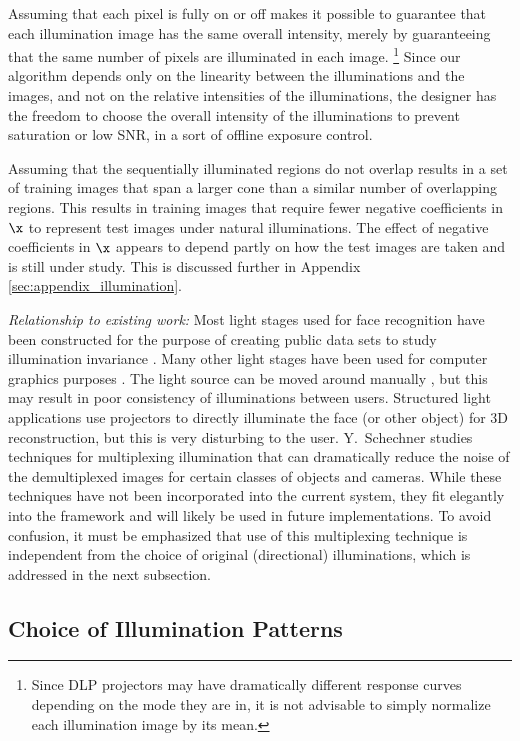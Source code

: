 Assuming that each pixel is fully on or off makes it possible to guarantee that each
illumination image has the same overall intensity, merely by guaranteeing that
the same number of pixels are illuminated in each image.  \footnote{Since DLP
projectors may have dramatically different response curves depending on the
mode they are in, it is not advisable to simply normalize each illumination
image by its mean.} Since our algorithm depends only on the linearity between
the illuminations and the images, and not on the relative intensities of the
illuminations, the designer has the freedom to choose the overall intensity of
the illuminations to prevent saturation or low SNR, in a sort of offline
exposure control.

Assuming that the sequentially illuminated regions do not overlap results in a
set of training images that span a larger cone than a similar number of
overlapping regions.  This results in training images that require fewer
negative coefficients in $\x$ to represent test images under natural
illuminations.  The effect of negative coefficients in $\x$ appears to depend
partly on how the test images are taken and is still under study.
This is discussed further in Appendix \ref{sec:appendix_illumination}.

{\em Relationship to existing work:} Most light stages used for face
recognition have been constructed for the purpose of creating public data sets
to study illumination invariance \cite{Georghiades2001-PAMI, Gross2008-FGR}.
Many other light stages have been used for computer graphics purposes
\cite{debevec2000acquiring, jones2005performance}.  The light source can be
moved around manually \cite{masselus2002free}, but this may result in poor
consistency of illuminations between users.  Structured light applications use
projectors to directly illuminate the face (or other object)
\cite{zhang2002rapid} for 3D reconstruction, but this is very disturbing to the
user.  Y.\ Schechner \cite{schechner2007multiplexing} studies techniques for
multiplexing illumination that can dramatically reduce the noise of the
demultiplexed images for certain classes of objects and cameras.  While these
techniques have not been incorporated into the current system, they fit
elegantly into the framework and will likely be used in future implementations.
To avoid confusion, it must be emphasized that use of this multiplexing
technique is independent from the choice of original (directional)
illuminations, which is addressed in the next subsection.

\subsection{Choice of Illumination Patterns}

